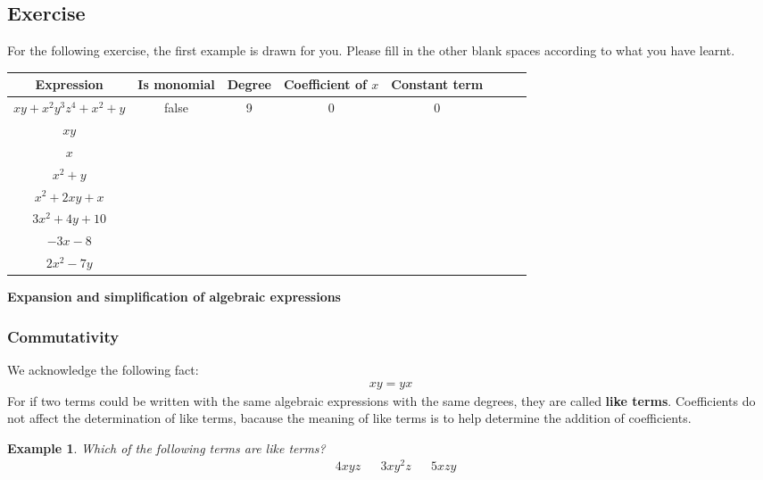 \documentclass[12pt]{article}
\newtheorem{example}{Example}
\begin{document}
    \subsection*{Exercise}
    For the following exercise, the first example is drawn for you. Please fill in the other blank spaces according to what you have learnt.
    \begin{center}
        \begin{tabular}{|c|c|c|c|c|c|c|c|}
            \hline
            Expression&Is monomial&Degree&Coefficient of $x$&Constant term\\
            \hline
            $xy+x^2y^3z^4+x^2+y$&false&9&0&0\\
            \hline
            $xy$&&&&\\
            \hline
            $x$&&&&\\
            \hline
            $x^2+y$&&&&\\
            \hline
            $x^2+2xy+x$&&&&\\
            \hline
            $3x^2+4y+10$&&&&\\
            \hline
            $-3x-8$&&&&\\
            \hline
            $2x^2-7y$&&&&\\
            \hline
        \end{tabular}
    \end{center}

    \begin{center}
        \textbf{Expansion and simplification of algebraic expressions}
    \end{center}

    \subsubsection*{Commutativity}

    We acknowledge the following fact:\begin{align*}
        xy=yx
    \end{align*}
    For if two terms could be written with the same algebraic expressions with the same degrees, they are called \textbf{like terms}. Coefficients do not affect the determination of like terms, bacause the meaning of like terms is to help determine the addition of coefficients.

    \begin{example}
        Which of the following terms are like terms?\begin{align*}
            &4xyz&&3xy^2z&&5xzy
        \end{align*}
    \end{example}
\end{document}
